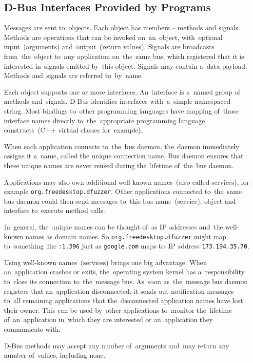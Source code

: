 \documentclass[conference]{IEEEtran}
\begin{document}
\subsection{D-Bus Interfaces Provided by Programs}
Messages are sent to~objects. Each object has members -- methods and signals.
Methods are operations that can be invoked on~an~object, with~optional input~(arguments) and~output~(return values).
Signals are broadcasts from~the~object to~any application on~the~same bus, which
registered that it is interested in~signals emitted by~this object. Signals may
contain a~data payload. Methods and~signals are referred to~by~name.

Each object supports one or more interfaces. An~interface is a~named group
of methods and~signals. D-Bus identifies interfaces with~a~simple namespaced string.
Most bindings to~other programming languages have mapping of~those interface names
directly to~the~appropriate programming language constructs~(C++ virtual classes
for~example).

When each application connects to~the~bus daemon, the~daemon immediately
assigns it a~name, called the unique connection name. Bus daemon ensures that
these unique names are never reused during the~lifetime of~the~bus daemon.

Applications may also own additional well-known names~(also called services),
for example \texttt{org.freedesktop.dfuzzer}. Other applications connected
to~the~same bus daemon could then send messages to~this bus name~(service),
object and interface to~execute method calls.

In~general, the~unique names can be thought of~as IP addresses and~the well-known
names as domain names. So \texttt{org.freedesktop.dfuzzer} might map to~something
like \texttt{:1.396} just as \texttt{google.com} maps to~IP address
\texttt{173.194.35.70}.

Using well-known names~(services) brings one big advantage. When an~application
crashes or exits, the~operating system kernel has a~responsibility to~close
its connection to~the~message bus. As~soon as~the~message bus daemon registers
that an~application disconnected, it sends out notification messages to~all remaining
applications that the~disconnected application names have lost their owner.
This can be used by~other applications to~monitor the~lifetime of~an~application
in~which they are interested or an~application they communicate with.

D-Bus methods may accept any number of~arguments
and~may return any number of~values, including none. 
\end{document}
